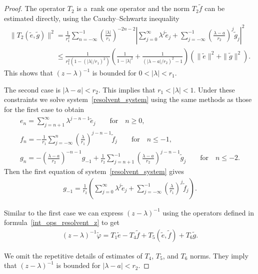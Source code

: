 \documentclass[pdftex]{sigma}
\numberwithin{equation}{section}
\begin{document}
\begin{proof}
The operator $T_2$ is a~rank one operator and the norm $T_2\tilde{f}$ can be estimated directly, using the
Cauchy--Schwartz inequality
\begin{gather*}
\|T_2(\tilde{e},\tilde{g})\|^2=
\frac{1}{r_1^2}\sum\limits_{n=-\infty}^{-1}\left(\frac{|\lambda|}{r_1}\right)^{-2n-2}\left|\sum\limits_{j=0}^\infty\lambda^j\tilde{e}_j
+ \sum\limits_{j=-\infty}^{-1}\left(\frac{\lambda-a}{r_2}\right)^j\tilde{g}_j\right|^2
\\
\phantom{\|T_2(\tilde{e},\tilde{g})\|^2}{}
 \le\frac{1}{r_1^2(1-(|\lambda|/r_1)^2)}\left(\frac{1}{1-|\lambda|^2}+ \frac{1}{(|\lambda-a|/r_2)^2-1}\right)
\left(\|\tilde{e}\|^2+\|\tilde{g}\|^2\right).
\end{gather*}
This shows that $(z-\lambda)^{-1}$ is bounded for $0<|\lambda|<r_1$.

The second case is $|\lambda-a|<r_2$.
This implies that $r_1<|\lambda|<1$.
Under these constraints we solve system~\eqref{resolvent_system} using the same methods as those for the f\/irst case to
obtain
\begin{gather*}
e_n =\sum\limits_{j=n+1}^\infty \lambda^{j-n-1}\tilde{e}_j
\qquad\text{for}\quad n\ge0,
\\
f_n =-\frac{1}{r_1}\sum\limits_{j=-\infty}^n \left(\frac{\lambda}{r_1}\right)^{j-n-1}\tilde{f}_j
\qquad\text{for}\quad n\le-1,
\\
g_n =-\left(\frac{\lambda-a}{r_2}\right)^{-n-1}g_{-1}+\frac{1}{r_2}\sum\limits_{j=n+1}^{-1}\left(\frac{\lambda-a}{r_2}\right)^{j-n-1}\tilde{g}_j
\qquad
\text{for}
\quad
n\le-2.
\end{gather*}
Then the f\/irst equation of system~\eqref{resolvent_system} gives
\begin{gather*}
g_{-1}=\frac{1}{r_2}\left(\sum\limits_{j=0}^\infty\lambda^j\tilde{e}_j+\sum\limits_{j=-\infty}^{-1}\left(\frac{\lambda}{r_1}\right)^j\tilde{f}_j\right).
\end{gather*}

Similar to the f\/irst case we can express $(z-\lambda)^{-1}$ using the operators def\/ined in
formula~\eqref{int_ops_resolvent_z} to get
\begin{gather*}
(z-\lambda)^{-1}\tilde{\varphi}=T_1\tilde{e}-T_4\tilde{f}+T_5(\tilde{e},\tilde{f})+T_6\tilde{g}.
\end{gather*}

We omit the repetitive details of estimates of $T_4$, $T_5$, and $T_6$ norms.
They imply that $(z-\lambda)^{-1}$ is bounded for $|\lambda -a|<r_2$.


\end{proof}
\end{document}
